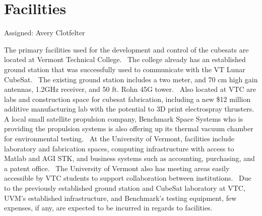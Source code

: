 \section{Facilities}
Assigned: Avery Clotfelter

The primary facilities used for the development and control of the
cubesats are located at Vermont Technical College.  The college
already has an established ground station that was successfully used
to communicate with the VT Lunar CubeSat.  The existing ground station
includes a two meter, and 70 cm high gain antennas, 1.2GHz receiver,
and 50 ft. Rohn 45G tower.  Also located at VTC are labs and
construction space for cubesat fabrication, including a new \$12
million additive manufacturing lab with the potential to 3D print
electrospray thrusters.  A local small satellite propulsion company,
Benchmark Space Systems who is providing the propulsion systems is
also offering up its thermal vacuum chamber for environmental
testing.  At the University of Vermont, facilities include laboratory
and fabrication spaces, computing infrastructure with access to Matlab
and AGI STK, and business systems such as accounting, purchasing, and
a patent office.  The University of Vermont also has meeting areas
easily accessible by VTC students to support collaboration between
institutions.  Due to the previously established ground station and
CubeSat laboratory at VTC, UVM’s established infrastructure, and
Benchmark’s testing equipment, few expenses, if any, are expected to
be incurred in regards to facilities.
